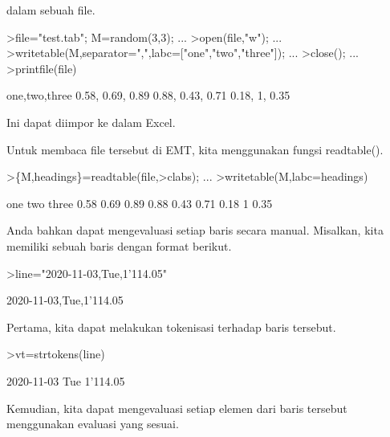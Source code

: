 \documentclass[a4paper,10pt]{article}
\begin{document}
\begin{eulernotebook}
\begin{eulercomment}
\begin{eulercomment}
\begin{eulercomment}
\begin{eulercomment}
\begin{eulercomment}
\begin{eulercomment}
\begin{eulercomment}
dalam sebuah file.
\end{eulercomment}
\begin{eulerprompt}
>file="test.tab"; M=random(3,3);  ...
>open(file,"w");  ...
>writetable(M,separator=",",labc=["one","two","three"]);  ...
>close(); ...
>printfile(file)
\end{eulerprompt}
\begin{euleroutput}
  one,two,three
        0.58,      0.69,      0.89
        0.88,      0.43,      0.71
        0.18,         1,      0.35
\end{euleroutput}
\begin{eulercomment}
Ini dapat diimpor ke dalam Excel.

Untuk membaca file tersebut di EMT, kita menggunakan fungsi
readtable().
\end{eulercomment}
\begin{eulerprompt}
>\{M,headings\}=readtable(file,>clabs); ...
>writetable(M,labc=headings)
\end{eulerprompt}
\begin{euleroutput}
         one       two     three
        0.58      0.69      0.89
        0.88      0.43      0.71
        0.18         1      0.35
\end{euleroutput}
\begin{eulercomment}
Anda bahkan dapat mengevaluasi setiap baris secara manual. Misalkan,
kita memiliki sebuah baris dengan format berikut.
\end{eulercomment}
\begin{eulerprompt}
>line="2020-11-03,Tue,1'114.05"
\end{eulerprompt}
\begin{euleroutput}
  2020-11-03,Tue,1'114.05
\end{euleroutput}
\begin{eulercomment}
Pertama, kita dapat melakukan tokenisasi terhadap baris tersebut.
\end{eulercomment}
\begin{eulerprompt}
>vt=strtokens(line)
\end{eulerprompt}
\begin{euleroutput}
  2020-11-03
  Tue
  1'114.05
\end{euleroutput}
\begin{eulercomment}
Kemudian, kita dapat mengevaluasi setiap elemen dari baris tersebut
menggunakan evaluasi yang sesuai.
\end{eulercomment}
\begin{eulerprompt}

\end{eulerprompt}
\end{eulercomment}
\end{eulercomment}
\end{eulercomment}
\end{eulercomment}
\end{eulercomment}
\end{eulercomment}
\end{eulernotebook}
\end{document}
